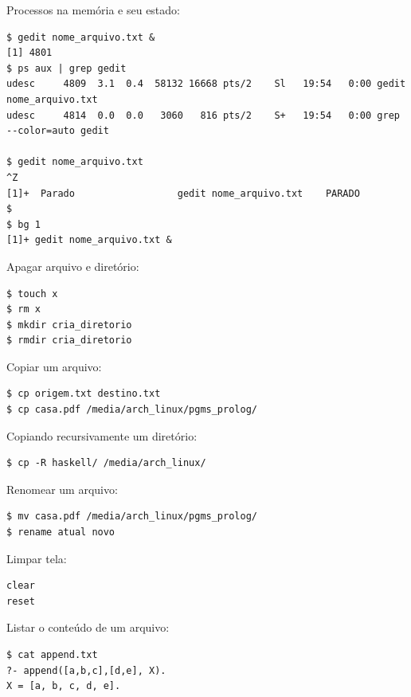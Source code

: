 \documentclass[final,a4paper]{article}
\begin{document}
\begin{description}
\pagebreak
\item[\ding{248}] Processos na memória e seu estado:
\begin{verbatim}
$ gedit nome_arquivo.txt &
[1] 4801
$ ps aux | grep gedit
udesc     4809  3.1  0.4  58132 16668 pts/2    Sl   19:54   0:00 gedit nome_arquivo.txt
udesc     4814  0.0  0.0   3060   816 pts/2    S+   19:54   0:00 grep --color=auto gedit

$ gedit nome_arquivo.txt 
^Z
[1]+  Parado                  gedit nome_arquivo.txt    PARADO
$
$ bg 1
[1]+ gedit nome_arquivo.txt &

\end{verbatim}

\pagebreak
\item[\ding{248}] Apagar arquivo  e diretório:
\begin{verbatim}
$ touch x
$ rm x
$ mkdir cria_diretorio
$ rmdir cria_diretorio
\end{verbatim}


\pagebreak
\item[\ding{248}] Copiar um arquivo:
\begin{verbatim}
$ cp origem.txt destino.txt
$ cp casa.pdf /media/arch_linux/pgms_prolog/

\end{verbatim}

\pagebreak
\item[\ding{248}] Copiando recursivamente um diretório:
\begin{verbatim}
$ cp -R haskell/ /media/arch_linux/

\end{verbatim}

\pagebreak
\item[\ding{248}] Renomear um arquivo:
\begin{verbatim}
$ mv casa.pdf /media/arch_linux/pgms_prolog/
$ rename atual novo

\end{verbatim}




\pagebreak
\item[\ding{248}] Limpar tela:
\begin{verbatim}
clear
reset

\end{verbatim}


\pagebreak
\item[\ding{248}] Listar o conteúdo de um arquivo:
\begin{verbatim}
$ cat append.txt 
?- append([a,b,c],[d,e], X).
X = [a, b, c, d, e].


\end{verbatim}
\end{description}
\end{document}
